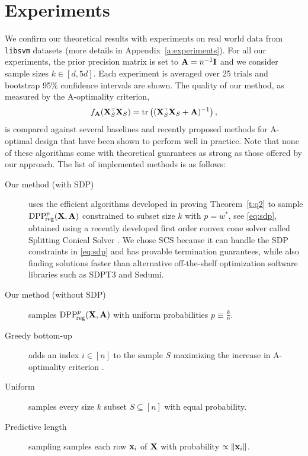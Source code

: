 \section{Experiments}\label{s:experiments}
We confirm our theoretical
results with experiments on real world data from \texttt{libsvm} datasets
\citep{libsvm} (more details in Appendix~\ref{a:experiments}).
For all our experiments, the prior precision matrix is set to $\mathbf A = n^{-1} \mathbf I$
and we consider sample sizes $k \in [d, 5d]$. Each experiment is
averaged over 25 trials and bootstrap 95\% confidence intervals are shown.
The quality of our method, as measured by the A-optimality
criterion,
\[f_{\A}(\X_S^\top \X_S) = \tr \left((\X_S^\top \X_S + \A)^{-1}\right),\]
is compared against several baselines and recently proposed methods
for A-optimal design that have been shown to perform well in
practice. Note that none of these algorithms come with theoretical
guarantees as strong as those offered by our approach. The list of
implemented methods is as follows: 
\begin{description}
    \item[Our method (with SDP)] uses the efficient algorithms
        developed in proving Theorem~\ref{t:q2} to sample
        ${{\mathrm{DPP}}_{\!\mathrm{reg}}^{p}}(\mathbf X,\mathbf A)$ constrained to subset size $k$
        with $p = w^*$, see \eqref{eq:sdp},
        obtained using a         recently developed first order convex cone solver called Splitting
        Conical Solver \citep[SCS, see][]{o2016conic}.
        We chose SCS because it can handle the SDP constraints in
        \eqref{eq:sdp} and has provable termination guarantees, while
        also finding solutions faster \citep{o2016conic} than alternative
        off-the-shelf optimization software libraries such as SDPT3
        and Sedumi.

    \item[Our method (without SDP)] samples ${{\mathrm{DPP}}_{\!\mathrm{reg}}^{p}}(\mathbf X,\mathbf A)$ with uniform
      probabilities $p \equiv \frac{k}{n}$.

          \item[Greedy bottom-up] adds an index $i \in [n]$ to the sample $S$
        maximizing the increase in A-optimality criterion
        \citep{greedy-supermodular,chamon2017approximate}.

    \item[Uniform] samples every size $k$ subset $S \subseteq [n]$
        with equal probability.

    \item[Predictive length] sampling \citep{zhu2015optimal} samples
        each row $\mathbf x_i$ of $\mathbf X$ with probability $\propto\|\mathbf x_i\|$.
\end{description}


